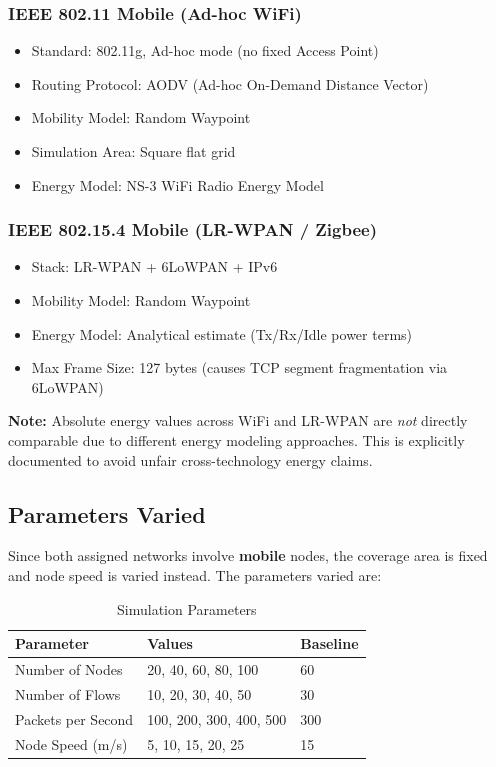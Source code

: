 \documentclass[12pt,a4paper]{article}
\begin{document}
\subsubsection{IEEE 802.11 Mobile (Ad-hoc WiFi)}
\begin{itemize}
    \item Standard: 802.11g, Ad-hoc mode (no fixed Access Point)
    \item Routing Protocol: AODV (Ad-hoc On-Demand Distance Vector)
    \item Mobility Model: Random Waypoint
    \item Simulation Area: Square flat grid
    \item Energy Model: NS-3 WiFi Radio Energy Model
\end{itemize}

\subsubsection{IEEE 802.15.4 Mobile (LR-WPAN / Zigbee)}
\begin{itemize}
    \item Stack: LR-WPAN + 6LoWPAN + IPv6
    \item Mobility Model: Random Waypoint
    \item Energy Model: Analytical estimate (Tx/Rx/Idle power terms)
    \item Max Frame Size: 127 bytes (causes TCP segment fragmentation via 6LoWPAN)
\end{itemize}

\textbf{Note:} Absolute energy values across WiFi and LR-WPAN are \textit{not} directly comparable due to different energy modeling approaches. This is explicitly documented to avoid unfair cross-technology energy claims.

\subsection{Parameters Varied}

Since both assigned networks involve \textbf{mobile} nodes, the coverage area is fixed and node speed is varied instead. The parameters varied are:

\begin{table}[htbp]
\centering
\caption{Simulation Parameters}
\begin{tabular}{@{}lll@{}}
\toprule
\textbf{Parameter} & \textbf{Values} & \textbf{Baseline} \\
\midrule
Number of Nodes & 20, 40, 60, 80, 100 & 60 \\
Number of Flows & 10, 20, 30, 40, 50 & 30 \\
Packets per Second & 100, 200, 300, 400, 500 & 300 \\
Node Speed (m/s) & 5, 10, 15, 20, 25 & 15 \\
\bottomrule
\end{tabular}
\end{table}
\end{document}
